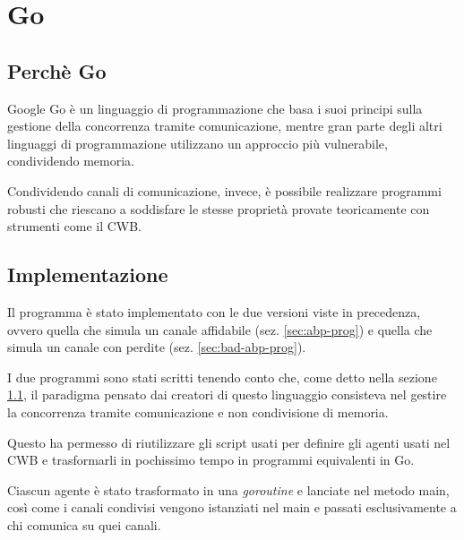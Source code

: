 \newpage{}\section{Go}

\subsection{Perchè Go}\label{sec:why-do-we-go}

Google Go è un linguaggio di programmazione che basa i suoi principi sulla
gestione della concorrenza tramite comunicazione, mentre gran parte degli
altri linguaggi di programmazione utilizzano un approccio più vulnerabile,
condividendo memoria.

Condividendo canali di comunicazione, invece, è possibile realizzare programmi
robusti che riescano a soddisfare le stesse proprietà provate teoricamente con
strumenti come il CWB.

\subsection{Implementazione}

Il programma è stato implementato con le due versioni viste in precedenza,
ovvero quella che simula un canale affidabile (sez. \ref{sec:abp-prog}) e
quella che simula un canale con perdite (sez. \ref{sec:bad-abp-prog}).

I due programmi sono stati scritti tenendo conto che, come detto nella sezione
\ref{sec:why-do-we-go}, il paradigma pensato dai creatori di questo linguaggio
consisteva nel gestire la concorrenza tramite comunicazione e non condivisione
di memoria.

Questo ha permesso di riutilizzare gli script usati per definire gli agenti
usati nel CWB e trasformarli in pochissimo tempo in programmi equivalenti in
Go.

Ciascun agente è stato trasformato in una \emph{goroutine} e lanciate nel
metodo main, così come i canali condivisi vengono istanziati nel main e
passati esclusivamente a chi comunica su quei canali.
